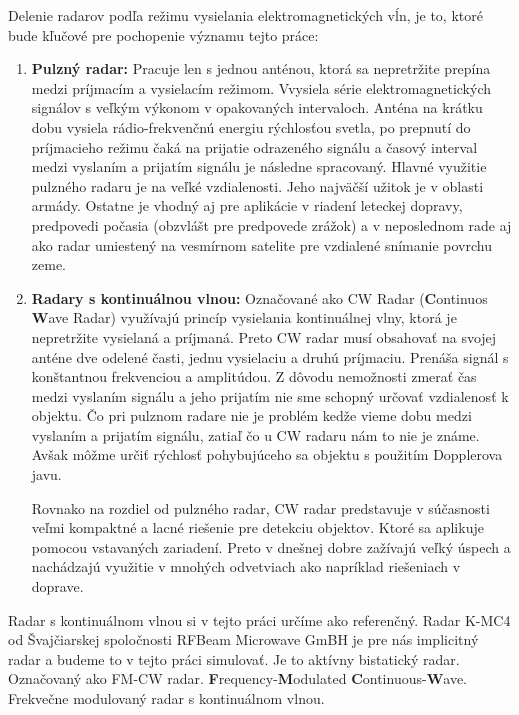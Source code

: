     Delenie radarov podľa režimu vysielania elektromagnetických vĺn, je to, ktoré bude kľučové pre pochopenie významu tejto práce\cite{radarhandbook}:
    \begin{enumerate}
      \item \textbf{Pulzný radar:} Pracuje len s jednou anténou, ktorá sa nepretržite prepína medzi príjmacím a vysielacím režimom. Vvysiela série elektromagnetických signálov s veľkým výkonom v opakovaných intervaloch. Anténa na krátku dobu vysiela rádio-frekvenčnú energiu rýchlosťou svetla, po prepnutí do príjmacieho režimu čaká na prijatie odrazeného signálu a časový interval medzi vyslaním a prijatím signálu je následne spracovaný. Hlavné využitie pulzného radaru je na veľké vzdialenosti. Jeho najväčší užitok je v oblasti armády. Ostatne je vhodný aj pre aplikácie v riadení leteckej dopravy, predpovedi počasia (obzvlášt pre predpovede zrážok) a v neposlednom rade aj ako radar umiestený na vesmírnom satelite pre vzdialené snímanie povrchu zeme.
      \item \textbf{Radary s kontinuálnou vlnou:} Označované ako CW Radar (\textbf{C}ontinuos \textbf{W}ave Radar) využívajú princíp vysielania kontinuálnej vlny, ktorá je nepretržite vysielaná a príjmaná. Preto CW radar musí obsahovať na svojej anténe dve odelené časti, jednu vysielaciu a druhú príjmaciu. Prenáša signál s konštantnou frekvenciou a amplitúdou. Z dôvodu nemožnosti zmerať čas medzi vyslaním signálu a jeho prijatím nie sme schopný určovať vzdialenosť k objektu. Čo pri pulznom radare nie je problém kedže vieme dobu medzi vyslaním a prijatím signálu, zatiaľ čo u CW radaru nám to nie je známe. Avšak môžme určiť rýchlosť pohybujúceho sa objektu s použitím Dopplerova javu. 

      Rovnako na rozdiel od pulzného radar, CW radar predstavuje v súčasnosti veľmi kompaktné a lacné riešenie pre detekciu objektov. Ktoré sa aplikuje pomocou vstavaných zariadení. Preto v dnešnej dobre zažívajú veľký úspech a nachádzajú využitie v mnohých odvetviach ako napríklad riešeniach v doprave.
    \end{enumerate}
    Radar s kontinuálnom vlnou si v tejto práci určíme ako referenčný.
    Radar K-MC4 od Švajčiarskej spoločnosti RFBeam Microwave GmBH je pre nás implicitný radar a budeme to v tejto práci simulovať. Je to aktívny bistatický radar. Označovaný ako FM-CW radar. \textbf{F}requency-\textbf{M}odulated \textbf{C}ontinuous-\textbf{W}ave. Frekvečne modulovaný radar s kontinuálnom vlnou.

